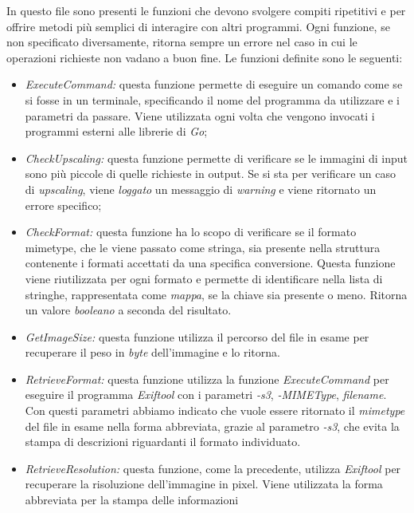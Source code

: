In questo file sono presenti le funzioni che devono svolgere compiti ripetitivi
e per offrire metodi più semplici di interagire con altri programmi. Ogni
funzione, se non specificato diversamente, ritorna sempre un errore nel caso in
cui le operazioni richieste non vadano a buon fine. Le funzioni
definite sono le seguenti:
\begin{itemize}
    \item \emph{ExecuteCommand:} questa funzione permette di eseguire un
          comando come se si fosse in un terminale, specificando il nome del
          programma da utilizzare e i parametri da passare. Viene utilizzata ogni
          volta che vengono invocati i programmi esterni alle librerie di \emph{Go};
    \item \emph{CheckUpscaling:} questa funzione permette di verificare se le
          immagini di input sono più piccole di quelle richieste in output. Se
          si sta per verificare un caso di \emph{upscaling}, viene
          \emph{loggato} un messaggio di \emph{warning} e viene ritornato un
          errore specifico;
    \item \emph{CheckFormat:} questa funzione ha lo scopo di verificare se il
          formato \glsfirstoccur\gls{mimetype}, che le viene passato come
          stringa, sia presente nella struttura contenente i formati accettati
          da una specifica conversione. Questa funzione viene riutilizzata per
          ogni formato e permette di identificare nella lista di stringhe,
          rappresentata come \emph{mappa}, se la chiave sia presente o meno.
          Ritorna un valore \emph{booleano} a seconda del risultato.
    \item \emph{GetImageSize:} questa funzione utilizza il percorso del file in
          esame per recuperare il peso in \emph{byte} dell'immagine e lo ritorna.
    \item \emph{RetrieveFormat:} questa funzione utilizza la funzione
          \emph{ExecuteCommand} per eseguire il programma \emph{Exiftool} con i
          parametri \emph{-s3}, \emph{-MIMEType}, \emph{filename}. Con questi
          parametri abbiamo indicato che vuole essere ritornato il \emph{mimetype} del
          file in esame nella forma abbreviata, grazie al parametro \emph{-s3}, che
          evita la stampa di descrizioni riguardanti il formato individuato.
    \item \emph{RetrieveResolution:} questa funzione, come la precedente,
          utilizza \emph{Exiftool} per recuperare la risoluzione dell'immagine in
          pixel. Viene utilizzata la forma abbreviata per la stampa delle informazioni

\end{itemize}
